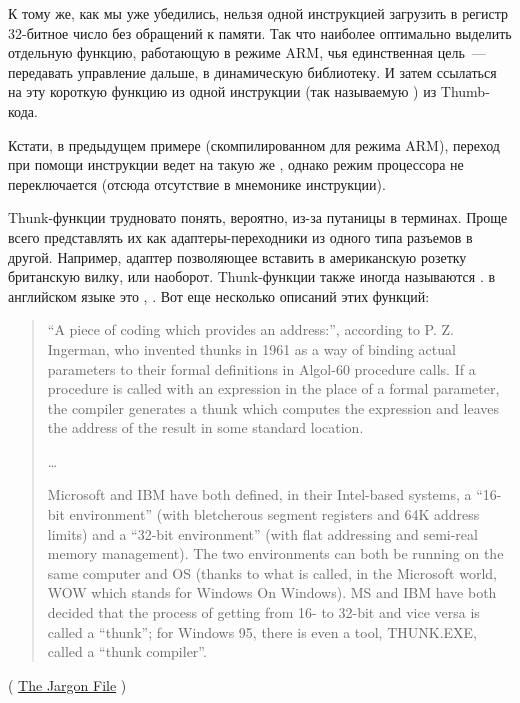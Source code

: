 К тому же, как мы уже убедились, нельзя одной инструкцией загрузить в регистр 32-битное число без обращений к памяти.
Так что наиболее оптимально выделить отдельную функцию, работающую в режиме ARM, 
чья единственная цель~--- передавать управление дальше, в динамическую библиотеку.
И затем ссылаться на эту короткую функцию из одной инструкции (так называемую ) из Thumb-кода.

Кстати, в предыдущем примере (скомпилированном для режима ARM), переход при помощи инструкции  ведет 
на такую же , однако режим процессора не переключается (отсюда отсутствие  в мнемонике инструкции).


Thunk-функции трудновато понять, вероятно, из-за путаницы в терминах.
Проще всего представлять их как адаптеры-переходники из одного типа разъемов в другой.
Например, адаптер позволяющее вставить в американскую розетку британскую вилку, или наоборот.
Thunk-функции также иногда называются .  в английском языке это , .
Вот еще несколько описаний этих функций:

\begin{framed}
\begin{quotation}
“A piece of coding which provides an address:”, according to P. Z. Ingerman, 
who invented thunks in 1961 as a way of binding actual parameters to their formal 
definitions in Algol-60 procedure calls. If a procedure is called with an expression 
in the place of a formal parameter, the compiler generates a thunk which computes 
the expression and leaves the address of the result in some standard location.

\dots

Microsoft and IBM have both defined, in their Intel-based systems, a “16-bit environment” 
(with bletcherous segment registers and 64K address limits) and a “32-bit environment” 
(with flat addressing and semi-real memory management). The two environments can both be 
running on the same computer and OS (thanks to what is called, in the Microsoft world, 
WOW which stands for Windows On Windows). MS and IBM have both decided that the process 
of getting from 16- to 32-bit and vice versa is called a “thunk”; for Windows 95, 
there is even a tool, THUNK.EXE, called a “thunk compiler”.
\end{quotation}
\end{framed}
( \href{http://go.yurichev.com/17362}{The Jargon File} )

